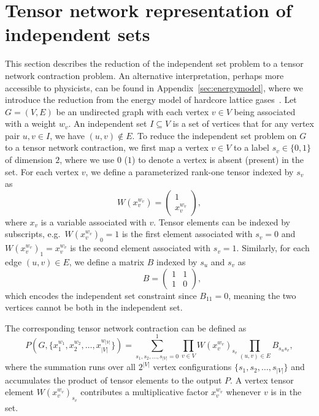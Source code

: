 \documentclass[onefignum, onetabnum]{siamart190516}
\newcommand{\<}{\langle}
\renewcommand{\>}{\rangle}
\newcommand{\App}[1]{Appendix~\ref{#1}}
\begin{document}
\section{Tensor network representation of independent sets} \label{sec:tnmap}
This section describes the reduction of the independent set problem to a tensor network contraction problem.
An alternative interpretation, perhaps more accessible to physicists, can be found in \App{sec:energymodel}, where we introduce the reduction from the energy model of hardcore lattice gases~\cite{Dyre2016, Fernandes2007}.
Let $G=(V,E)$ be an undirected graph with each vertex $v\in V$ being associated with a weight $w_v$.
An independent set $I \subseteq V$ is a set of vertices that for any vertex pair $u,v \in I$, we have $(u, v) \not\in E$.
To reduce the independent set problem on $G$ to a tensor network contraction, we first map a vertex $v\in V$ to a label $s_v \in \{0, 1\}$ of dimension $2$, where we use $0$ ($1$) to denote a vertex is absent (present) in the set.
For each vertex $v$, we define a parameterized rank-one tensor indexed by $s_v$ as
\begin{equation}
    W(x_v^{w_v}) = \left(\begin{matrix}
        1 \\
        x_v^{w_v}
    \end{matrix}\right),\label{eq:vertextensor}
\end{equation}
where $x_v$ is a variable associated with $v$.
Tensor elements can be indexed by subscripts, e.g.\ $W(x_v^{w_v})_0=1$ is the first element associated with $s_v=0$ and $W(x_v^{w_v})_1=x_v^{w_v}$ is the second element associated with $s_v=1$.
Similarly, for each edge $(u, v) \in E$, we define a matrix $B$ indexed by $s_u$ and $s_v$ as
\begin{equation}
    \qquad \quad 
       B = \left(\begin{matrix}
        1  & 1\\
        1 & 0
    \end{matrix}\right), \label{eq:edgetensor}
\end{equation}
which encodes the independent set constraint since $B_{11} = 0$, meaning the two vertices cannot be both in the independent set. 

The corresponding tensor network contraction can be defined as
\begin{equation}\label{eq:idp}
    P(G, \{x_1^{w_1}, x_{2}^{w_2}, \ldots,x_{|V|}^{w_{|V|}}\}) = \sum\limits_{s_1, s_2, \ldots, s_{|V|} = 0}^{1} \prod\limits_{v\in V} W(x_v^{w_v})_{s_v} \prod\limits_{(u,v) \in E} B_{s_u s_v},
\end{equation}
where the summation runs over all $2^{|V|}$ vertex configurations $\{s_1, s_{2}, \ldots,s_{|V|}\}$ and accumulates the product of tensor elements to the output $P$. 
A vertex tensor element $W(x_v^{w_v})_{s_v}$ contributes a multiplicative factor $x_v^{w_v}$ whenever $v$ is in the set.
\end{document}
